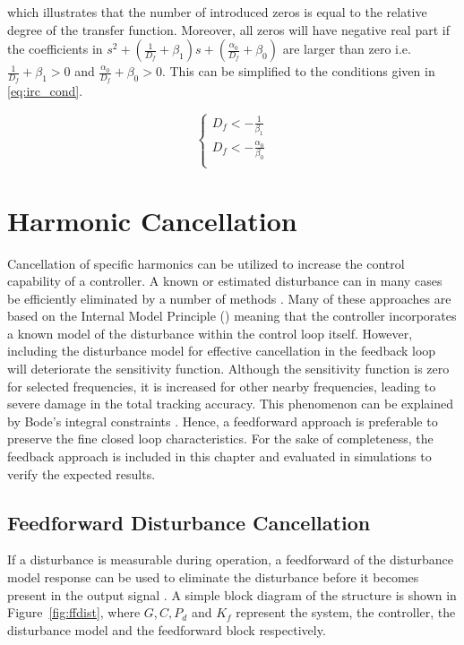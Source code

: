 which illustrates that the number of introduced zeros is equal to the relative degree of the transfer function. Moreover, all zeros will have negative real part if the coefficients in $s^2 + (\frac{1}{D_f} + \beta_1)s + (\frac{\alpha_0}{D_f} + \beta_0)$  are larger than zero i.e. $ \frac{1}{D_f} + \beta_1>0$ and $\frac{\alpha_0}{D_f} + \beta_0>0$. This can be simplified to the conditions given in \eqref{eq:irc_cond}.

\begin{equation}
  \label{eq:irc_cond}
  \begin{cases}
    D_f < -\frac{1}{\beta_1}\\
    D_f < -\frac{\alpha_0}{\beta_0}\\
  \end{cases}
\end{equation}
\newpage

\section{Harmonic Cancellation}
Cancellation of specific harmonics can be utilized to increase the control capability of a controller. A known or estimated disturbance can in many cases be efficiently eliminated by a number of methods \citep{fujimoto2009rro, fujimoto2004repetitive, vilanova2008disturbance}. Many of these approaches are based on the Internal Model Principle (\abbrIMP) meaning that the controller incorporates a known model of the disturbance within the control loop itself. However, including the disturbance model for effective cancellation in the feedback loop will deteriorate the sensitivity function. Although the sensitivity function is zero for selected frequencies, it is increased for other nearby frequencies, leading to severe damage in the total tracking accuracy. This phenomenon can be explained by Bode's integral constraints \citep{Ljung:2003}. Hence, a feedforward approach is preferable to preserve the fine closed loop characteristics. For the sake of completeness, the \abbrIMP feedback approach is included in this chapter and evaluated in simulations to verify the expected results.

\subsection{Feedforward Disturbance Cancellation}\label{subsec:distff}
If a disturbance is measurable during operation, a feedforward of the disturbance model response can be used to eliminate the disturbance before it becomes present in the output signal \citep{industrial}. A simple block diagram of the structure is shown in Figure~\ref{fig:ffdist}, where $G, C, P_d$ and $K_f$ represent the system, the controller, the disturbance model and the feedforward block respectively.

